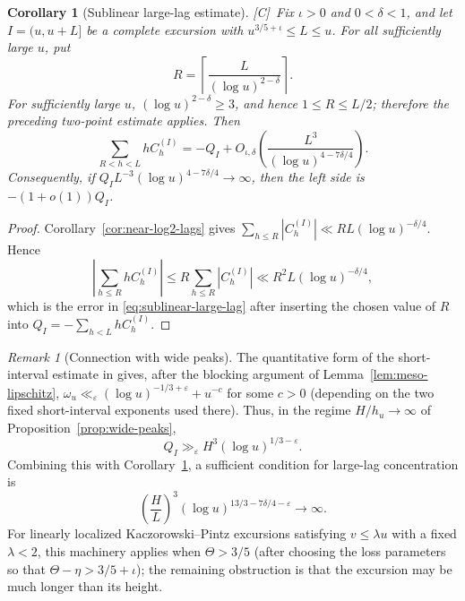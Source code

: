 \documentclass[11pt,reqno]{amsart}
\numberwithin{equation}{section}
\theoremstyle{plain}
\newtheorem{corollary}[theorem]{Corollary}
\theoremstyle{definition}
\theoremstyle{remark}
\newtheorem{remark}[theorem]{Remark}
\newcommand{\tagC}{\textup{[C]}}
\begin{document}
\begin{corollary}[Sublinear large-lag estimate]
\label{cor:sublinear-large-lag}
\tagC\ Fix $\iota>0$ and $0<\delta<1$, and let $I=(u,u+L]$ be a complete
excursion with $u^{3/5+\iota}\le L\le u$.  For all sufficiently
large $u$, put
\begin{equation}
R=\left\lceil\frac{L}{(\log u)^{2-\delta}}\right\rceil.
\end{equation}
For sufficiently large $u$, $(\log u)^{2-\delta}\ge3$, and hence
$1\le R\le L/2$; therefore the preceding two-point estimate applies.
Then
\begin{equation}
\label{eq:sublinear-large-lag}
\sum_{R<h<L}hC_h^{(I)}
=-Q_I+O_{\iota,\delta}\!\left(
\frac{L^3}{(\log u)^{4-7\delta/4}}
\right).
\end{equation}
Consequently, if
$Q_I L^{-3}(\log u)^{4-7\delta/4}\to\infty$, then the left side is
$-(1+o(1))Q_I$.
\end{corollary}

\begin{proof}
Corollary~\ref{cor:near-log2-lags} gives
$\sum_{h\le R}|C_h^{(I)}|\ll RL(\log u)^{-\delta/4}$. Hence
\begin{equation}
\left|\sum_{h\le R}hC_h^{(I)}\right|
\le R\sum_{h\le R}|C_h^{(I)}|
\ll R^2L(\log u)^{-\delta/4},
\end{equation}
which is the error in \eqref{eq:sublinear-large-lag} after inserting the
chosen value of $R$ into $Q_I=-\sum_{h<L}hC_h^{(I)}$.
\end{proof}

\begin{remark}[Connection with wide peaks]
\label{rem:sublinear-wide-peaks}
The quantitative form of the short-interval estimate in
\cite[Theorem~1.1]{MatomakiTeravainen2023} gives, after the blocking argument
of Lemma~\ref{lem:meso-lipschitz},
$\omega_u\ll_\varepsilon(\log u)^{-1/3+\varepsilon}+u^{-c}$ for some $c>0$
(depending on the two fixed short-interval exponents used there). Thus, in
the regime $H/h_u\to\infty$ of Proposition~\ref{prop:wide-peaks},
\begin{equation}
Q_I\gg_\varepsilon H^3(\log u)^{1/3-\varepsilon}.
\end{equation}
Combining this with Corollary~\ref{cor:sublinear-large-lag}, a sufficient
condition for large-lag concentration is
\begin{equation}
\left(\frac HL\right)^3
(\log u)^{13/3-7\delta/4-\varepsilon}\longrightarrow\infty.
\end{equation}
For linearly localized Kaczorowski--Pintz excursions satisfying
$v\le\lambda u$ with a fixed $\lambda<2$, this machinery applies when
$\Theta>3/5$ (after choosing the loss parameters so that
$\Theta-\eta>3/5+\iota$); the remaining obstruction is that the excursion
may be much longer than its height.
\end{remark}
\end{document}
